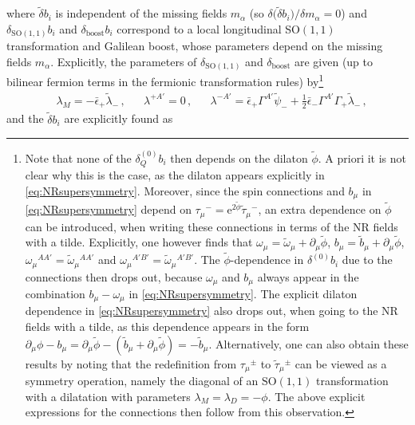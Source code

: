 \documentclass[a4paper,10pt,openany]{article}
\def\rme{\mathrm{e}}
\begin{document}
	where $\tilde\delta b_i$ is independent of the missing fields $m_\alpha$ (so $\delta\big(\tilde\delta b_i\big)/\delta m_\alpha = 0$) and $\delta_{\mathrm{SO}(1,1)} b_i$ and $\delta_{\mathrm{boost}} b_i$ correspond to a local longitudinal SO$(1,1)$ transformation and Galilean boost, whose parameters depend on the missing fields $m_\alpha$. Explicitly, the parameters of $\delta_{\mathrm{SO}(1,1)}$ and $\delta_{\mathrm{boost}}$ are given (up to bilinear fermion terms in the fermionic transformation rules) by\footnote{Note that none of the $\delta^{(0)}_Q b_i$ then depends on the dilaton $\tilde\phi$. A priori it is not clear why this is the case, as the dilaton appears explicitly in \eqref{eq:NRsupersymmetry}. Moreover, since the spin connections and $b_\mu$ in \eqref{eq:NRsupersymmetry} depend on $\tau_\mu{}^-=\rme^{2\tilde\phi}\tilde\tau_\mu{}^-$, an extra dependence on $\tilde{\phi}$ can be introduced, when writing these connections in terms of the NR fields with a tilde. Explicitly, one however finds that $\omega_\mu = \tilde\omega_\mu + \partial_\mu\tilde\phi$, $b_\mu = \tilde b_\mu + \partial_\mu\tilde\phi$, $\omega_\mu{}^{AA'}=\tilde\omega_\mu{}^{AA'}$ and $\omega_\mu{}^{A'B'} = \tilde\omega_\mu{}^{A'B'}$.
		The $\tilde\phi$-dependence in $\delta^{(0)} b_i$ due to the connections then drops out, because $\omega_\mu$ and $b_\mu$ always appear in the combination $b_\mu - \omega_\mu$ in \eqref{eq:NRsupersymmetry}. The explicit dilaton dependence in \eqref{eq:NRsupersymmetry} also drops out, when going to the NR fields with a tilde, as this dependence appears in the form $\partial_\mu \phi - b_\mu  = \partial_\mu\tilde\phi - (\tilde b_\mu + \partial_\mu\tilde\phi) = -\tilde b_\mu$. Alternatively, one can also obtain these results by noting that the redefinition from $\tau_\mu{}^\pm$ to $\tilde\tau_\mu{}^\pm$ can be viewed as a symmetry operation, namely the diagonal of an $\mathrm{SO}(1,1)$ transformation with a dilatation with parameters $\lambda_M=\lambda_D=-\phi$. The above explicit expressions for the connections then follow from this observation.}
	\begin{align}\label{eq:compensating11boosts}
		&\lambda_M = -\bar\epsilon_+\tilde\lambda_-\,, && \lambda^{+A'}=0\,,&& \lambda^{-A'} = \bar\epsilon_+\Gamma^{A'}\tilde\psi_{-} + \frac12\bar\epsilon_-\Gamma^{A'}\Gamma_+\tilde\lambda_-\,,
	\end{align}
	and the $\tilde{\delta} b_i$ are explicitly found as
\end{document}
